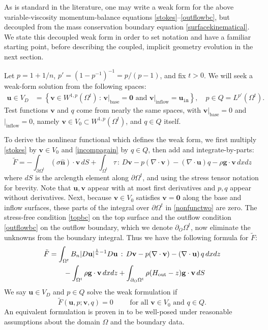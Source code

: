 \documentclass[letterpaper,final,12pt,reqno]{amsart}
\newcommand{\hbn}{\hat{\mathbf{n}}}
\newcommand{\bg}{\mathbf{g}}
\newcommand{\bu}{\mathbf{u}}
\newcommand{\bv}{\mathbf{v}}
\newcommand{\bzero}{\bm{0}}
\begin{document}
As is standard in the literature, one may write a weak form for the above variable-viscosity momentum-balance equations \eqref{stokes}--\eqref{outflowbc}, but decoupled from the mass conservation boundary equation \eqref{surfacekinematical}.  We state this decoupled weak form in order to set notation and have a familiar starting point, before describing the coupled, implicit geometry evolution in the next section.

Let $p=1+1/n$, $p'=(1-p^{-1})^{-1}=p/(p-1)$, and fix $t>0$.  We will seek a weak-form solution from the following spaces:
\begin{align*}
\bu \in V_D &= \left\{\bv \in W^{1,p}(\Omega^t)\,:\,\bv\big|_{\text{base}}=\bzero \text{ and } \bv\big|_{\text{inflow}} = \bu_{\texttt{in}}\right\}, \quad p \in Q =L^{p'}(\Omega^t).
\end{align*}
Test functions $\bv$ and $q$ come from nearly the same spaces, with $\bv\big|_{\text{base}} =0$ and $\big|_{\text{inflow}} = 0$, namely $\bv \in V_0 \subset W^{1,p}(\Omega^t)$, and $q \in Q$ itself.

To derive the nonlinear functional which defines the weak form, we first multiply \eqref{stokes} by $\bv\in V_0$ and \eqref{incompagain} by $q\in Q$, then add and integrate-by-parts:
\begin{equation}
\tilde F = -\int_{\partial\Omega^t} (\sigma \hbn)\cdot \bv\,dS + \int_{\Omega^t} \tau \,:\,D\bv - p (\nabla \cdot \bv) - \left(\nabla \cdot \bu\right) q - \rho \mathbf{g} \cdot \bv \,dx dz \label{nonfunctwo}
\end{equation}
where $dS$ is the arclength element along $\partial\Omega^t$, and using the stress tensor notation for brevity.  Note that $\bu,\bv$ appear with at most first derivatives and $p,q$ appear without derivatives.  Next, because $\bv\in V_0$ satisfies $\bv=\bzero$ along the base and inflow surfaces, these parts of the integral over $\partial\Omega^t$ in \eqref{nonfunctwo} are zero.  The stress-free condition \eqref{topbc} on the top surface and the outflow condition \eqref{outflowbc} on the outflow boundary, which we denote $\partial_O \Omega^t$, now eliminate the unknowns from the boundary integral.  Thus we have the following formula for $\tilde F$:
\begin{align}
\tilde F &= \int_{\Omega^t} B_n |D\bu|^{\frac{1}{n} - 1} D\bu\,:\,D\bv - p (\nabla \cdot \bv) - \left(\nabla \cdot \bu\right) q \,dx dz \label{definetildeF} \\
    &\qquad  - \int_{\Omega^t} \rho \mathbf{g} \cdot \bv \,dx dz + \int_{\partial_O \Omega^t} \rho (H_{\text{out}}-z) \bg \cdot \bv \,dS \notag
\end{align}
We say $\bu\in V_D$ and $p\in Q$ solve the weak formulation if
\begin{equation}
\tilde F(\bu,p;\bv,q) = 0 \qquad \text{ for all } \bv\in V_0 \text{ and } q\in Q.  \label{weak}
\end{equation}
An equivalent formulation is proven in \cite[Theorem 3.8]{JouvetRappaz2011} to be well-posed under reasonable assumptions about the domain $\Omega$ and the boundary data.
\end{document}
